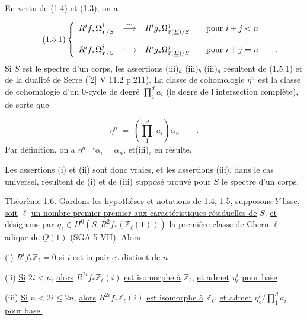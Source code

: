 En vertu de (1.4) et (1.3), on a

\begin{equation}\tag{1.5.1}
\left\{
\begin{array}{ccl}
R^i f_* \Omega^j_{Y/S} & \stackrel{\sim}{\longrightarrow} & R^i g_* \Omega^j_{\mathbb{P}(\underline{E})/S} \qquad \mbox{pour } i+j < n \\[3ex]
R^i f_* \Omega^j_{Y/S} & \lhook\joinrel\longrightarrow & R^i g_* \Omega^j_{\mathbb{P}(\underline{E})/S} \qquad \mbox{pour } i+j = n \qquad .
\end{array}
\right.
\end{equation}
Si $S$ est le spectre d'un corps, les assertions (iii)$_a$ (iii)$_b$ (iii)$_d$ résultent de (1.5.1) et de la dualité de Serre ([2] V 11.2 p.211). La classe de
cohomologie $\eta^n$ est la classe de cohomologie d'un $0$-cycle de degré $\prod_1^d a_i$ (le degré de l'intersection complète), de sorte que

\begin{equation*}
\eta^n \;=\; \left( \prod_1^d \; a_i \right) \alpha_n \qquad .
\end{equation*}
Par définition, on a $\eta^{n-i} \alpha_i = \alpha_n$, et(iii)$_c$ en résulte.

Les assertions (i) et (ii) sont donc vraies, et les assertions (iii), dans le cas universel, résultent de (i) et de (iii) supposé prouvé pour $S$ le spectre d'un corps.

\underline{Théorème} 1.6. \underline{Gardons les hypothèses et notations de} 1.4, 1.5, \underline{supposons} $Y$ \underline{lisse,} \underline{soit} $\ell$ \underline{un nombre premier premier aux caractéristiques résiduelles de} $S$, \underline{et désignons par} $\eta_\ell \in H^0(S,R^2 f_*( \mathbb{Z}_\ell(1)))$ \underline{la première classe de Chern} $\ell$\underline{-adique de} $\underline{O}(1)$ (SGA 5 VII). \underline{Alors}

(i) $R^i f_* \mathbb{Z}_\ell = 0$ \underline{si} $i$ \underline{est impair et distinct de} $n$

(ii) \underline{Si} $2i < n$, \underline{alors} $R^{2i} f_* \mathbb{Z}_\ell(i)$ \underline{est isomorphe à} $\mathbb{Z}_\ell$, \underline{et admet} $\eta_\ell^i$ \underline{pour base}

(iii) \underline{Si} $n < 2i \leq 2n$, \underline{alors} $R^{2i} f_* \mathbb{Z}_\ell(i)$ \underline{est isomorphe à} $\mathbb{Z}_\ell$, \underline{et admet} $\eta_\ell^i / \prod_1^d a_i$ \underline{pour base.}

